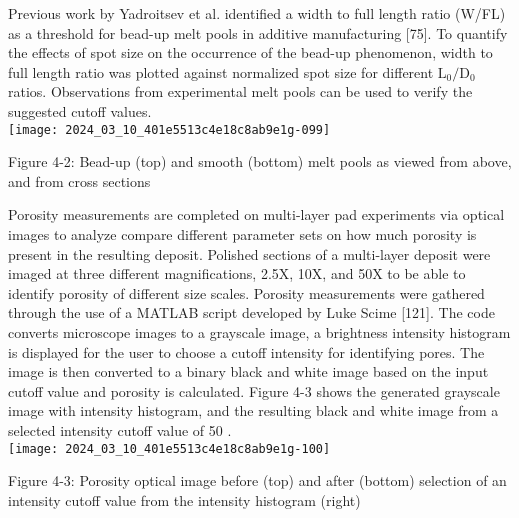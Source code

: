 \documentclass[10pt]{article}
\begin{document}
Previous work by Yadroitsev et al. identified a width to full length ratio (W/FL) as a threshold for bead-up melt pools in additive manufacturing [75]. To quantify the effects of spot size on the occurrence of the bead-up phenomenon, width to full length ratio was plotted against normalized spot size for different $\mathrm{L}_{0} / \mathrm{D}_{0}$ ratios. Observations from experimental melt pools can be used to verify the suggested cutoff values.\\
\texttt{[image: 2024\_03\_10\_401e5513c4e18c8ab9e1g-099]}

Figure 4-2: Bead-up (top) and smooth (bottom) melt pools as viewed from above, and from cross sections

Porosity measurements are completed on multi-layer pad experiments via optical images to analyze compare different parameter sets on how much porosity is present in the resulting deposit. Polished sections of a multi-layer deposit were imaged at three different magnifications, 2.5X, 10X, and 50X to be able to identify porosity of different size scales. Porosity measurements were gathered through the use of a MATLAB script developed by Luke Scime [121]. The code converts microscope images to a grayscale image, a brightness intensity histogram is displayed for the user to choose a cutoff intensity for identifying pores. The image is then converted to a binary black and white image based on the input cutoff value and porosity is calculated. Figure 4-3 shows the generated grayscale image with intensity histogram, and the resulting black and white image from a selected intensity cutoff value of 50 .\\
\texttt{[image: 2024\_03\_10\_401e5513c4e18c8ab9e1g-100]}

Figure 4-3: Porosity optical image before (top) and after (bottom) selection of an intensity cutoff value from the intensity histogram (right)
\end{document}
